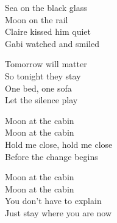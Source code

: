 \begin{lyrics}
Sea on the black glass\\
Moon on the rail\\
Claire kissed him quiet\\
Gabi watched and smiled

Tomorrow will matter\\
So tonight they stay\\
One bed, one sofa\\
Let the silence play

Moon at the cabin\\
Moon at the cabin\\
Hold me close, hold me close\\
Before the change begins

Moon at the cabin\\
Moon at the cabin\\
You don’t have to explain\\
Just stay where you are now
\end{lyrics}

